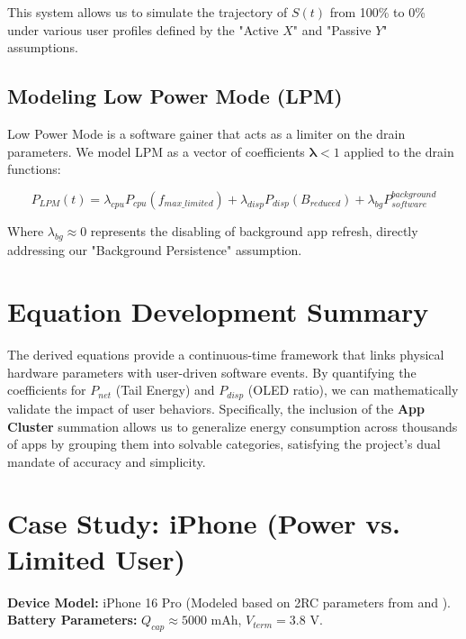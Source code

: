 \documentclass[12pt]{article}
\begin{document}
This system allows us to simulate the trajectory of $S(t)$ from 100\% to 0\% under various user profiles defined by the "Active $X$" and "Passive $Y$" assumptions.

\subsection{Modeling Low Power Mode (LPM)}

Low Power Mode is a software gainer that acts as a limiter on the drain parameters. We model LPM as a vector of coefficients $\mathbf{\lambda} < 1$ applied to the drain functions:

\begin{equation}
P_{LPM}(t) = \lambda_{cpu} P_{cpu}(f_{max\_limited}) + \lambda_{disp} P_{disp}(B_{reduced}) + \lambda_{bg} P_{software}^{background}
\end{equation}

Where $\lambda_{bg} \approx 0$ represents the disabling of background app refresh, directly addressing our "Background Persistence" assumption.

\section{Equation Development Summary}

The derived equations provide a continuous-time framework that links physical hardware parameters with user-driven software events. By quantifying the coefficients for $P_{net}$ (Tail Energy) and $P_{disp}$ (OLED ratio), we can mathematically validate the impact of user behaviors. Specifically, the inclusion of the \textbf{App Cluster} summation allows us to generalize energy consumption across thousands of apps by grouping them into solvable categories, satisfying the project's dual mandate of accuracy and simplicity.

\newpage

\section{Case Study: iPhone (Power vs. Limited User)}

\textbf{Device Model:} iPhone 16 Pro (Modeled based on 2RC parameters from \cite{6} and \cite{14}). \\
\textbf{Battery Parameters:} $Q_{cap} \approx 5000$ mAh, $V_{term} = 3.8$ V.
\end{document}

